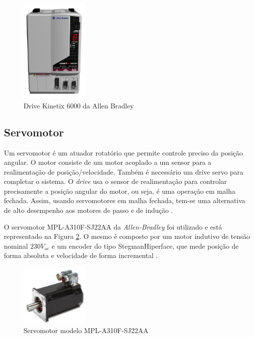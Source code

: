 \begin{figure}[!ht]
  \centering
    \includegraphics[width=0.3\textwidth]{figs/fundamentos/kinetix6000.jpg}
    \caption{Drive Kinetix 6000 da Allen Bradley\label{kinetix6000}}
\end{figure}

\subsection{Servomotor}

Um servomotor é um atuador rotatório que permite controle preciso da posição angular. O motor consiste de um motor acoplado a um sensor para a realimentação de posição/velocidade. Também é necessário um drive servo para completar o sistema. O \textit{drive} usa o sensor de realimentação para controlar precisamente a posição angular do motor, ou seja, é uma operação em malha fechada. Assim, usando servomotores em malha fechada, tem-se uma alternativa de alto desempenho aos motores de passo e de indução \cite{defServoMotores}.

O servomotor MPL-A310F-SJ22AA da \textit{Allen-Bradley} foi utilizado e está representado na Figura \ref{servomotor}. O mesmo é composto por um motor indutivo de tensão nominal $230V_{\mathrm{ac}}$ e um encoder do tipo StegmanHiperface, que mede posição de forma absoluta e velocidade de forma incremental \cite{redytton}.

\begin{figure}[!ht]
  \centering
    \includegraphics[width=0.3\textwidth]{figs/fundamentos/servomotor}
    \caption{Servomotor modelo MPL-A310F-SJ22AA\label{servomotor}}
\end{figure}

